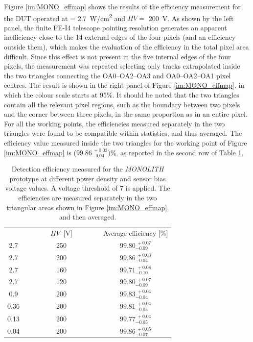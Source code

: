 		Figure \ref{im:MONO_effmap} shows the results of the efficiency measurement for the DUT operated at \power = \SI{2.7}{\watt/\centi\meter^2} and $HV=$ \SI{200}{\volt}. As shown by the left panel, the finite FE-I4 telescope pointing resolution generates an apparent inefficiency close to the 14 external edges of the four pixels (and an efficiency outside them), which makes the evaluation of the efficiency in the total pixel area difficult. Since this effect is not present in the five internal edges of the four pixels, the measurement was repeated selecting only tracks extrapolated inside the two triangles connecting the OA0--OA2--OA3 and OA0--OA2--OA1 pixel centres. 
		The result is shown in the right panel of Figure \ref{im:MONO_effmap}, in which the colour scale starts at 95\%. It should be noted that the two triangles contain all the relevant pixel regions, such as the boundary between two pixels and the corner between three pixels, in the same proportion as in an entire pixel. For all the working points, the efficiencies measured separately in the two triangles were found to be compatible within statistics, and thus averaged. The efficiency value measured inside the two triangles for the working point of Figure \ref{im:MONO_effmap} is ($ 99.86_{-0.04}^{~\!+0.03} $)\%, as reported in the second row of Table \ref{tab:MONO_eff_ipream_HV_pscan}.

		\begin{table}[h]
			\centering 
			\renewcommand{\arraystretch}{1.4}
			\begin{tabular}{|c|c|c|}
			\cline{1-3}
			 \power [W/cm$^2$] & ~~~~~~~$HV$~[\si{V}]~~~~~~~  & Average efficiency [\%] \\
			\cline{1-3}
			2.7   & 250 & $ 99.80_{-0.09}^{~\!+0.07} $ \\
			2.7   & 200 & $ 99.86_{-0.04}^{~\!+0.03} $ \\
			2.7   & 160 & $ 99.71_{-0.10}^{~\!+0.08} $ \\
			2.7   & 120 & $ 99.80_{-0.09}^{~\!+0.07} $ \\
			0.9   & 200 & $ 99.83_{-0.04}^{~\!+0.04} $ \\
			0.36  & 200 & $ 99.81_{-0.05}^{~\!+0.04} $ \\
			0.13  & 200 & $ 99.77_{-0.05}^{~\!+0.04} $ \\
			0.04  & 200 & $ 99.86_{-0.07}^{~\!+0.05} $ \\
			\cline{1-3}
			\end{tabular}
			\caption{Detection efficiency measured for the \textit{MONOLITH} prototype at different power density and sensor bias voltage values. A voltage threshold of 7 \noise is applied. The efficiencies are measured separately in the two triangular areas shown in Figure \ref{im:MONO_effmap}, and then averaged.}
			\label{tab:MONO_eff_ipream_HV_pscan}
		\end{table} 

